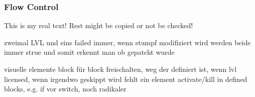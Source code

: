 \subsubsection{Flow Control} \label{subsubsection:counter-improve-tampering-flow}
This is my real text! Rest might be copied or not be checked!


zweimal LVL und eins failed immer, wenn stumpf modifiziert wird werden beide immer strue und somit erkennt man ob gepatcht wurde

visuelle elemente block für block freischalten, weg der definiert ist, wenn lvl licensed, wenn irgendwo geskippt wird fehlt ein element
activate/kill in defined blocks, e.g. if vor switch, noch radikaler
